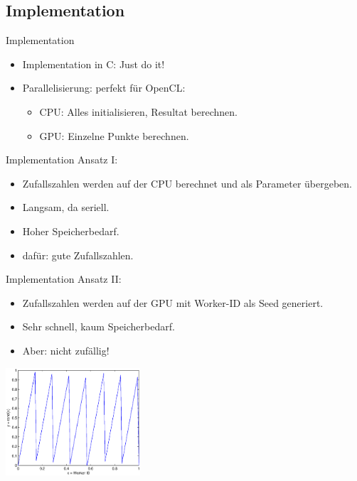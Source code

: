 \documentclass{beamer}
\begin{document}
\subsection{Implementation}
\begin{frame}{Implementation}
	\begin{itemize}
		\item Implementation in C: Just do it!
		\item Parallelisierung: perfekt für OpenCL:
			\begin{itemize}
				\item<2-> CPU: Alles initialisieren, Resultat berechnen.
				\item<2-> GPU: Einzelne Punkte berechnen.
			\end{itemize}
	\end{itemize}
\end{frame}
\begin{frame}{Implementation}
	Ansatz I: \\
	
	\begin{itemize}
		\item Zufallszahlen werden auf der CPU berechnet und als Parameter übergeben.
		\item Langsam, da seriell.
		\item Hoher Speicherbedarf.
		\item dafür: gute Zufallszahlen.
	\end{itemize}
\end{frame}
\begin{frame}{Implementation}
	Ansatz II: \\
	
	\begin{minipage}{5cm}
	\begin{itemize}
		\item Zufallszahlen werden auf der GPU mit Worker-ID als Seed generiert.
		\item Sehr schnell, kaum Speicherbedarf.
		\item Aber: nicht zufällig!
	\end{itemize}
	\end{minipage}
	\begin{minipage}{5cm}
		\includegraphics[width=5cm]{images/idAsSeed.eps}
	\end{minipage}

\end{frame}
\end{document}

